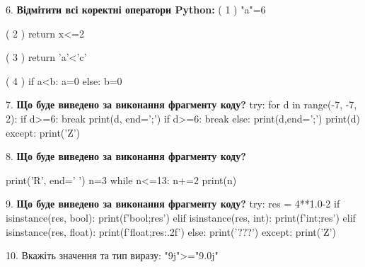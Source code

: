 \documentclass[11pt]{article}
\begin{document}
\par\vspace{5mm}

6. %
\textbf{Відмітити всі коректні оператори Python:}
( 1 ) "a"=6

( 2 ) return x<=2

( 3 ) return 'a'<'c'

( 4 ) if a<b: a=0 else: b=0
\par\vspace{5mm}

7. \textbf{Що буде виведено за виконання фрагменту коду?}
try:
    for d in range(-7, -7, 2):
        if d>=6:
            break
        print(d, end=';')
        if d>=6:
            break
    else:
        print(d,end=';')
    print(d)
except:
    print('Z')
\par\vspace{5mm}

8. \textbf{Що буде виведено за виконання фрагменту коду?}

print('R', end=' ')
n=3
while n<=13:
    n+=2
print(n)

\par\vspace{5mm}

9. \textbf{Що буде виведено за виконання фрагменту коду?}
try:
    res = 4**1.0-2
    if isinstance(res, bool):
        print(f'bool;{res}')
    elif isinstance(res, int):
        print(f'int;{res}')
    elif isinstance(res, float):
        print(f'float;{res:.2f}')
    else:
        print('???')
except:
    print('Z')
\par\vspace{5mm}

10. 
Вкажіть значення та тип виразу:
"9j">="9.0j"
\par\vspace{5mm}

\newpage
\end{document}
